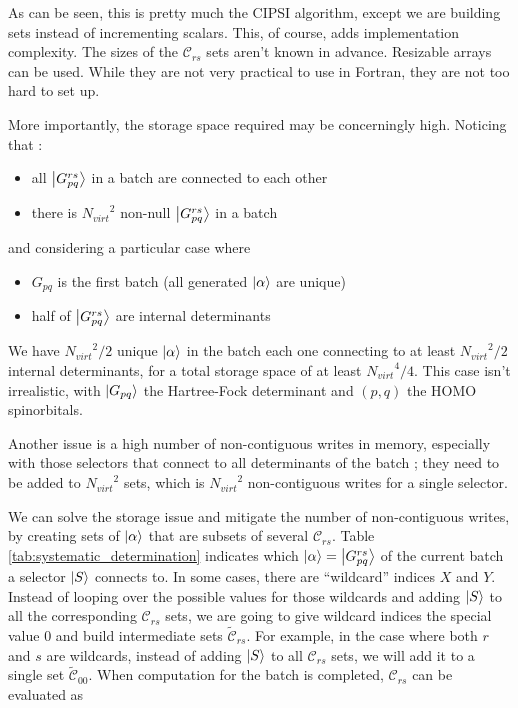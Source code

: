 \documentclass[./thesis.tex]{subfiles}
\begin{document}
As can be seen, this is pretty much the CIPSI algorithm, except we are building sets instead of incrementing scalars. This, of course, adds implementation complexity. The sizes of the $\mathcal{C}_{rs}$ sets aren't known in advance. Resizable arrays can be used. While they are not very practical to use in Fortran, they are not too hard to set up. 

More importantly, the storage space required may be concerningly high. Noticing that :
\begin{itemize}
\item
all $\ket{G^{rs}_{pq}}$ in a batch are connected to each other
\item
there is ${N_{virt}}^2$ non-null $\ket{G^{rs}_{pq}}$ in a batch
\end{itemize}
and considering a particular case where
\begin{itemize}
\item
$G_{pq}$ is the first batch (all generated ${\ket{\alpha}}$ are unique)
\item
half of $\ket{G^{rs}_{pq}}$ are internal determinants
\end{itemize}

We have ${N_{virt}}^2 / 2$ unique ${\ket{\alpha}}$ in the batch each one connecting to at least ${N_{virt}}^2 / 2$ internal determinants, for a total storage space of at least ${N_{virt}}^4 / 4$.
This case isn't irrealistic, with $\ket {G_{pq}}$ the Hartree-Fock determinant and $(p,q)$ the HOMO spinorbitals.

Another issue is a high number of non-contiguous writes in memory, especially with those selectors that connect to all determinants of the batch ; they need to be added to ${N_{virt}}^2$ sets, which is ${N_{virt}}^2$ non-contiguous writes for a single selector.

We can solve the storage issue and mitigate the number of non-contiguous writes, by creating sets of ${\ket{\alpha}}$ that are subsets of several $\mathcal{C}_{rs}$.
Table \ref{tab:systematic_determination} indicates which ${\ket{\alpha}} = \ket {G_{pq}^{rs}}$ of the current batch a selector $\ket{S}$ connects to. In some cases, there are ``wildcard'' indices $X$ and $Y$. Instead of looping over the possible values for those wildcards and adding $\ket{S}$ to all the corresponding $\mathcal{C}_{rs}$ sets, we are going to give wildcard indices the special value $0$ and build intermediate sets $\tilde{\mathcal{C}}_{rs}$. For example, in the case where both $r$ and $s$ are wildcards, instead of adding $\ket{S}$ to all $\mathcal{C}_{rs}$ sets, we will add it to a single set $\tilde{\mathcal{C}}_{00}$. When computation for the batch is completed, $\mathcal{C}_{rs}$ can be evaluated as
\end{document}

